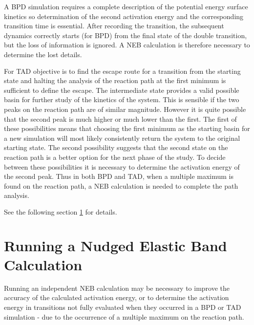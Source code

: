 A BPD simulation requires a complete description of the potential
energy surface kinetics so determination of the second activation
energy and the corresponding transition time is essential. After
recording the transition, the subsequent dynamics correctly starts
(for BPD) from the final state of the double transition, but the loss
of information is ignored. A NEB calculation is therefore necessary to
determine the lost details.

For TAD objective is to find the escape route for a transition from
the starting state and halting the analysis of the reaction path at
the first minimum is sufficient to define the escape. The intermediate
state provides a valid possible basin for further study of the
kinetics of the system. This is sensible if the two peaks on the
reaction path are of similar magnitude. However it is quite possible
that the second peak is much higher or much lower than the first. The
first of these possibilities means that choosing the first minimum as
the starting basin for a new simulation will most likely consistently
return the system to the original starting state. The second
possibility suggests that the second state on the reaction path is a
better option for the next phase of the study. To decide between these
possibilities it is necessary to determine the activation energy of
the second peak. Thus in both BPD and TAD, when a multiple maximum is
found on the reaction path, a NEB calculation is needed to complete
the path analysis.

See the following section \ref{nebrun} for details.

\section{Running a Nudged Elastic Band Calculation}
\label{nebrun}
Running an independent NEB calculation may be necessary to improve
the accuracy of the calculated activation energy, or to determine the
activation energy in transitions not fully evaluated when they
occurred in a BPD or TAD simulation - due to the occurrence of a
multiple maximum on the reaction path.

